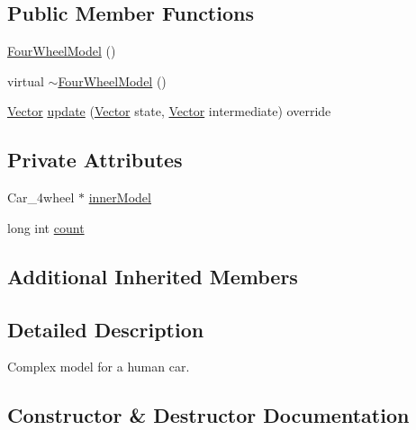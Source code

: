 \subsection*{Public Member Functions}
\begin{DoxyCompactItemize}
\item 
\hyperlink{classFourWheelModel_a2ae886651e6494e9655cdfe7bb55523f}{Four\+Wheel\+Model} ()
\item 
virtual \hyperlink{classFourWheelModel_a58298c9fc4880ff13b4f2f7271536c77}{$\sim$\+Four\+Wheel\+Model} ()
\item 
\hyperlink{Agent_8hpp_a5dd127bb3cb18b011cf5fd80a906e830}{Vector} \hyperlink{classFourWheelModel_a2169e82abcb344e4bb345c563e6ea7de}{update} (\hyperlink{Agent_8hpp_a5dd127bb3cb18b011cf5fd80a906e830}{Vector} state, \hyperlink{Agent_8hpp_a5dd127bb3cb18b011cf5fd80a906e830}{Vector} intermediate) override
\end{DoxyCompactItemize}
\subsection*{Private Attributes}
\begin{DoxyCompactItemize}
\item 
Car\+\_\+4wheel $\ast$ \hyperlink{classFourWheelModel_aa4e5165e690a959eda31d186f83e615d}{inner\+Model}
\item 
long int \hyperlink{classFourWheelModel_a56bbb1ac91d8c35a239776d6beb49109}{count}
\end{DoxyCompactItemize}
\subsection*{Additional Inherited Members}


\subsection{Detailed Description}
Complex model for a human car. 

\subsection{Constructor \& Destructor Documentation}
